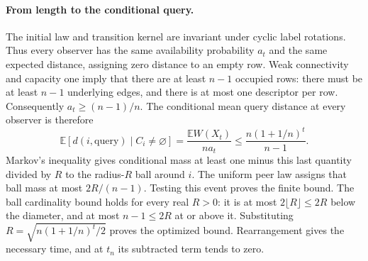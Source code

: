 \documentclass[11pt]{article}
\begin{document}
\paragraph{From length to the conditional query.}
The initial law and transition kernel are invariant under cyclic label
rotations. Thus every observer has the same availability probability
$a_t$ and the same expected distance, assigning zero distance to an empty
row. Weak connectivity and capacity one imply that there are at least
$n-1$ occupied rows: there must be at least $n-1$ underlying edges, and
there is at most one descriptor per row. Consequently $a_t\ge(n-1)/n$.
The conditional mean query distance at every observer is therefore
\[
 \mathbb E[d(i,\text{query})\mid C_i\ne\varnothing]
 =\frac{\mathbb EW(X_t)}{n a_t}
 \le\frac{n(1+1/n)^t}{n-1}.
\]
Markov's inequality gives conditional mass at least one minus this last
quantity divided by $R$ to the radius-$R$ ball around $i$. The uniform peer
law assigns that ball mass at most $2R/(n-1)$. Testing this event proves
the finite bound. The ball cardinality bound holds for every real $R>0$:
it is at most $2\lfloor R\rfloor\le2R$ below the diameter, and at most
$n-1\le2R$ at or above it. Substituting
$R=\sqrt{n(1+1/n)^t/2}$ proves the optimized bound. Rearrangement gives the
necessary time, and at $t_n$ its subtracted term tends to zero.
\end{document}
